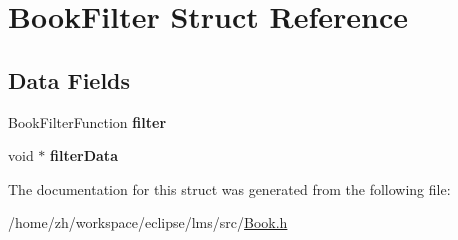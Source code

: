 \hypertarget{structBookFilter}{\section{Book\-Filter Struct Reference}
\label{structBookFilter}
}
\subsection*{Data Fields}
\begin{DoxyCompactItemize}
\item 
\hypertarget{structBookFilter_a6cb4dbc86cbaf45630c34c5bab5be904}{Book\-Filter\-Function {\bfseries filter}}\label{structBookFilter_a6cb4dbc86cbaf45630c34c5bab5be904}

\item 
\hypertarget{structBookFilter_acb1597eef5b7936e2863a3d180e6cf85}{void $\ast$ {\bfseries filter\-Data}}\label{structBookFilter_acb1597eef5b7936e2863a3d180e6cf85}

\end{DoxyCompactItemize}


The documentation for this struct was generated from the following file\-:\begin{DoxyCompactItemize}
\item 
/home/zh/workspace/eclipse/lms/src/\hyperlink{Book_8h}{Book.\-h}\end{DoxyCompactItemize}
